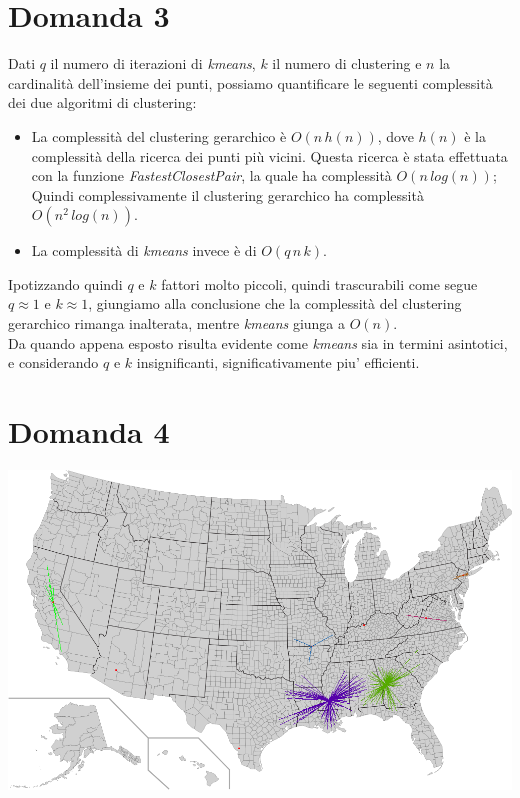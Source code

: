\documentclass{article}
\begin{document}
\section*{Domanda 3}
Dati $q$ il numero di iterazioni di \textit{kmeans}, $k$ il numero di clustering e $n$ la cardinalità dell'insieme dei punti, possiamo quantificare le seguenti complessità dei due algoritmi di clustering:
\begin{itemize}
\item La complessità del clustering gerarchico è $O(n\,h(n))$, dove $h(n)$ è la complessità della ricerca dei punti più vicini.
Questa ricerca è stata effettuata con la funzione \textit{FastestClosestPair}, la quale ha complessità $O(n\,log(n))$;
Quindi complessivamente il clustering gerarchico ha complessità $O(n^2\,log(n))$.
\item La complessità di \textit{kmeans} invece è di $O(q\,n\,k)$. 
\end{itemize}

\noindent Ipotizzando quindi $q$ e $k$ fattori molto piccoli, quindi trascurabili come segue $q \approx 1$ e $k \approx 1$, giungiamo alla conclusione che 
la complessità del clustering gerarchico rimanga inalterata, mentre \textit{kmeans} giunga a $O(n)$.\\
Da quando appena esposto risulta evidente come \textit{kmeans} sia in termini asintotici, e considerando $q$ e $k$ insignificanti, significativamente piu' efficienti.

\section*{Domanda 4}
\includegraphics[width=1.0\linewidth, valign=t]{figures/Domanda4}
\end{document}
